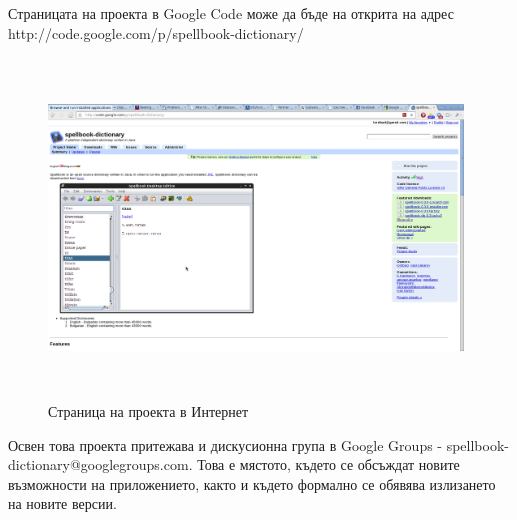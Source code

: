 Страницата на проекта в Google Code може да бъде на открита на адрес
http://code.google.com/p/spellbook-dictionary/

\begin{figure}[htbp]
  \caption{Страница на проекта в Интернет}
  \centering
  \includegraphics[width=110mm, height=90mm]{images/project-site.png}
\end{figure}

Освен това проекта притежава и дискусионна група в Google Groups -
spellbook-dictionary@googlegroups.com. Това е мястото, където се
обсъждат новите възможности на приложението, както и където формално
се обявява излизането на новите версии.


